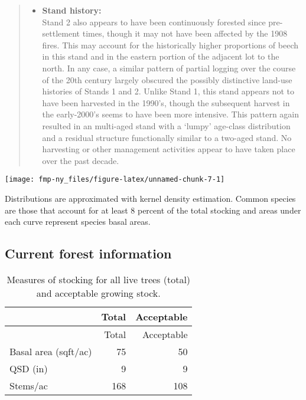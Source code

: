 \documentclass[]{tufte-handout}
\providecommand{\tightlist}{%
  \setlength{\itemsep}{0pt}\setlength{\parskip}{0pt}}
\begin{document}
\begin{quote}
\begin{itemize}
\tightlist
\item
  \textbf{Stand history:}\\
  \vspace{2pt} Stand 2 also appears to have been continuously forested
  since pre-settlement times, though it may not have been affected by
  the 1908 fires. This may account for the historically higher
  proportions of beech in this stand and in the eastern portion of the
  adjacent lot to the north. In any case, a similar pattern of partial
  logging over the course of the 20th century largely obscured the
  possibly distinctive land-use histories of Stands 1 and 2. Unlike
  Stand 1, this stand appears not to have been harvested in the 1990's,
  though the subsequent harvest in the early-2000's seems to have been
  more intensive. This pattern again resulted in an multi-aged stand
  with a `lumpy' age-class distribution and a residual structure
  functionally similar to a two-aged stand. No harvesting or other
  management activities appear to have taken place over the past decade.
\end{itemize}
\end{quote}

\begin{marginfigure}
\texttt{[image: fmp-ny\_files/figure-latex/unnamed-chunk-7-1]} \caption[Distributions are approximated with kernel density estimation]{Distributions are approximated with kernel density estimation. Common species are those that account for at least 8 percent of the total stocking and areas under each curve represent species basal areas.}\label{fig:unnamed-chunk-7}
\end{marginfigure}

\subsection{Current forest
information}\label{current-forest-information-1}

\begin{longtable}[]{@{}lrr@{}}
\caption{Measures of stocking for all live trees (total) and acceptable
growing stock.}\tabularnewline
\toprule
& Total & Acceptable\tabularnewline
\midrule
\endfirsthead
\toprule
& Total & Acceptable\tabularnewline
\midrule
\endhead
Basal area (sqft/ac) & 75 & 50\tabularnewline
QSD (in) & 9 & 9\tabularnewline
Stems/ac & 168 & 108\tabularnewline
\bottomrule
\end{longtable}
\end{document}
